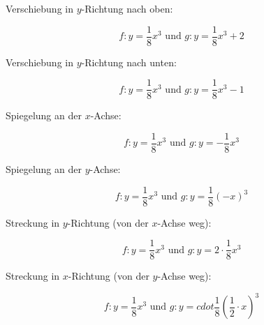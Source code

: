 

\renewcommand{\metaHeaderLine}{Screenshots fürs Skript}
\renewcommand{\arbeitsblattTitel}{Translationen}



\usetikzlibrary{shapes.geometric, arrows}

\arbeitsblattHeader{}

Verschiebung in $y$-Richtung nach oben:

$$f: y=\frac18x^3 \text{ und } g: y=\frac18x^3+2$$


Verschiebung in $y$-Richtung nach unten:

$$f: y=\frac18x^3 \text{ und } g: y=\frac18x^3-1$$
\newpage



Spiegelung an der $x$-Achse:

$$f: y=\frac18x^3 \text{ und } g: y=-\frac18x^3$$

Spiegelung an der $y$-Achse:

$$f: y=\frac18x^3 \text{ und } g: y=\frac18(-x)^3$$

\newpage


Streckung in $y$-Richtung (von der $x$-Achse weg):

$$f: y=\frac18x^3 \text{ und } g: y=2\cdot{}\frac18x^3$$

Streckung in $x$-Richtung (von der $y$-Achse weg):

$$f: y=\frac18x^3 \text{ und } g: y=cdot{}\frac18(\frac12\cdot{}x)^3$$


